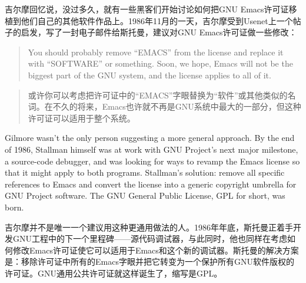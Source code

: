 \ifdefined\chs
吉尔摩回忆说，没过多久，就有一些黑客们开始讨论如何把GNU Emacs许可证移植到他们自己的其他软件作品上。1986年11月的一天，吉尔摩受到Usenet上一个帖子的启发，写了一封电子邮件给斯托曼，建议对GNU Emacs许可证做一些修改：
\fi

\ifdefined\eng
\begin{quote}
You should probably remove ``EMACS'' from the license and replace it with ``SOFTWARE'' or something. Soon, we hope, Emacs will not be the biggest part of the GNU system, and the license applies to all of it.
\end{quote}
\fi

\ifdefined\chs
\begin{quote}
或许你可以考虑把许可证中的``EMACS''字眼替换为``软件''或其他类似的名词。在不久的将来，Emacs也许就不再是GNU系统中最大的一部分，但这种许可证可以适用于整个系统。
\end{quote}
\fi

\ifdefined\eng
Gilmore wasn't the only person suggesting a more general approach. By the end of 1986, Stallman himself was at work with GNU Project's next major milestone, a source-code debugger, and was looking for ways to revamp the Emacs license so that it might apply to both programs. Stallman's solution: remove all specific references to Emacs and convert the license into a generic copyright umbrella for GNU Project software. The GNU General Public License, GPL for short, was born.
\fi

\ifdefined\chs
吉尔摩并不是唯一一个建议用这种更通用做法的人。1986年年底，斯托曼正着手开发GNU工程中的下一个里程碑——源代码调试器，与此同时，他也同样在考虑如何修改Emacs许可证使它可以适用于Emacs和这个新的调试器。斯托曼的解决方案是：移除许可证中所有的Emacs字眼并把它转变为一个保护所有GNU软件版权的许可证。GNU通用公共许可证就这样诞生了，缩写是GPL。
\fi

